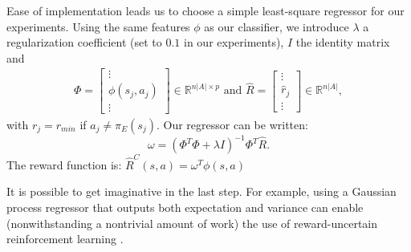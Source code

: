 \documentclass[smallextended]{svjour3}
\begin{document}
Ease of implementation leads us to choose a simple least-square regressor for our experiments. Using the same features $\phi$ as our classifier, we introduce $\lambda$ a regularization coefficient (set to $0.1$ in our experiments), $I$ the identity matrix and 
\begin{eqnarray}
  \Phi = \begin{bmatrix}
    \vdots\\
    \phi(s_j,a_j)\\
    \vdots
  \end{bmatrix} \in \mathbb{R}^{n|A|\times p}\textrm{ and }
  \hat R = \begin{bmatrix}
    \vdots\\
    \hat r_j\\
    \vdots
  \end{bmatrix}\in \mathbb{R}^{n|A|},
\end{eqnarray}
with $r_j = r_{min}$ if $a_j \neq \pi_E(s_j)$. Our regressor can be written:
\begin{equation}
  \omega = (\Phi^T\Phi + \lambda I)^{-1}\Phi^T\hat R.
\end{equation}
The reward function is: $\hat R^C(s,a) = \omega^T \phi(s,a)$

It is possible to get imaginative in the last step. For example, using a Gaussian process regressor \cite{rasmussen2006gaussian} that outputs both expectation and variance can enable (nonwithstanding a nontrivial amount of work) the use of reward-uncertain reinforcement learning \cite{regan2011robust}. 
\end{document}
